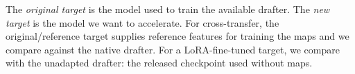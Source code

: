 The \emph{original target} is the model used to train the available drafter. The \emph{new target} is the model we want to accelerate. For cross-transfer, the original/reference target supplies reference features for training the maps and we compare against the native drafter. For a LoRA-fine-tuned target, we compare with the unadapted drafter: the released checkpoint used without maps.
